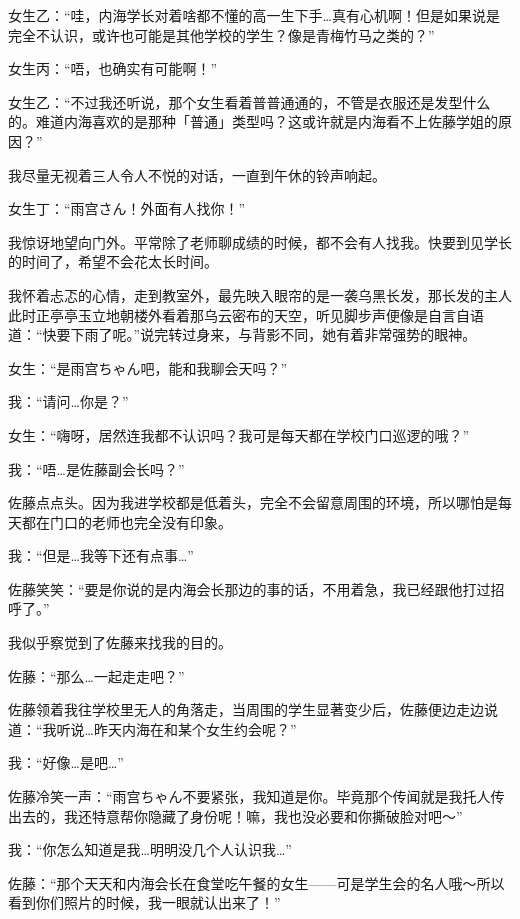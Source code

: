 女生乙：“哇，内海学长对着啥都不懂的高一生下手…真有心机啊！但是如果说是完全不认识，或许也可能是其他学校的学生？像是青梅竹马之类的？”

女生丙：“唔，也确实有可能啊！”

女生乙：“不过我还听说，那个女生看着普普通通的，不管是衣服还是发型什么的。难道内海喜欢的是那种「普通」类型吗？这或许就是内海看不上佐藤学姐的原因？”



我尽量无视着三人令人不悦的对话，一直到午休的铃声响起。

女生丁：“雨宫さん！外面有人找你！”

我惊讶地望向门外。平常除了老师聊成绩的时候，都不会有人找我。快要到见学长的时间了，希望不会花太长时间。

我怀着忐忑的心情，走到教室外，最先映入眼帘的是一袭乌黑长发，那长发的主人此时正亭亭玉立地朝楼外看着那乌云密布的天空，听见脚步声便像是自言自语道：“快要下雨了呢。”说完转过身来，与背影不同，她有着非常强势的眼神。

女生：“是雨宫ちゃん吧，能和我聊会天吗？”

我：“请问…你是？”

女生：“嗨呀，居然连我都不认识吗？我可是每天都在学校门口巡逻的哦？”

我：“唔…是佐藤副会长吗？”

佐藤点点头。因为我进学校都是低着头，完全不会留意周围的环境，所以哪怕是每天都在门口的老师也完全没有印象。

我：“但是…我等下还有点事…”

佐藤笑笑：“要是你说的是内海会长那边的事的话，不用着急，我已经跟他打过招呼了。”

我似乎察觉到了佐藤来找我的目的。

佐藤：“那么…一起走走吧？”

佐藤领着我往学校里无人的角落走，当周围的学生显著变少后，佐藤便边走边说道：“我听说…昨天内海在和某个女生约会呢？”

我：“好像…是吧…”

佐藤冷笑一声：“雨宫ちゃん不要紧张，我知道是你。毕竟那个传闻就是我托人传出去的，我还特意帮你隐藏了身份呢！嘛，我也没必要和你撕破脸对吧～”

我：“你怎么知道是我…明明没几个人认识我…”

佐藤：“那个天天和内海会长在食堂吃午餐的女生——可是学生会的名人哦～所以看到你们照片的时候，我一眼就认出来了！”

